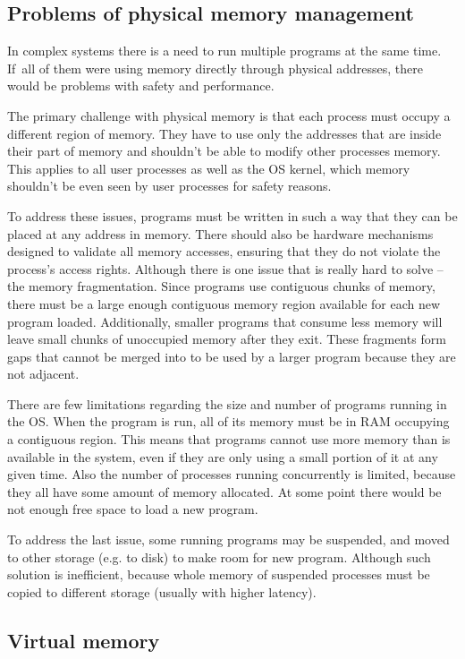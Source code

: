 \subsection{Problems of physical memory management}

In complex systems there is a need to run multiple programs at the same time.
If~all of them were using memory directly through physical addresses, there would be problems with safety and performance.

The primary challenge with physical memory is that each process must occupy a different region of memory.
They have to use only the addresses that are inside their part of memory and shouldn't be able to modify other processes memory.
This applies to all user processes as well as the OS kernel, which memory shouldn't be even seen by user processes for safety reasons.

To address these issues, programs must be written in such a way that they can be placed at any address in memory.
There should also be hardware mechanisms designed to validate all memory accesses, ensuring that they do not violate the process's access rights.
Although there is one issue that is really hard to solve -- the memory fragmentation.
Since programs use contiguous chunks of memory, there must be a large enough contiguous memory region available for each new program loaded.
Additionally, smaller programs that consume less memory will leave small chunks of unoccupied memory after they exit.
These fragments form gaps that cannot be merged into to be used by a larger program because they are not adjacent.

There are few limitations regarding the size and number of programs running in the OS.
When the program is run, all of its memory must be in RAM occupying a contiguous region.
This means that programs cannot use more memory than is available in the system, even if they are only using a small portion of it at any given time.
Also the number of processes running concurrently is limited, because they all have some amount of memory allocated.
At some point there would be not enough free space to load a new program.

To address the last issue, some running programs may be suspended, and moved to other storage (e.g. to disk) to make room for new program.
Although such solution is inefficient, because whole memory of suspended processes must be copied to different storage (usually with higher latency).

\subsection{Virtual memory}

